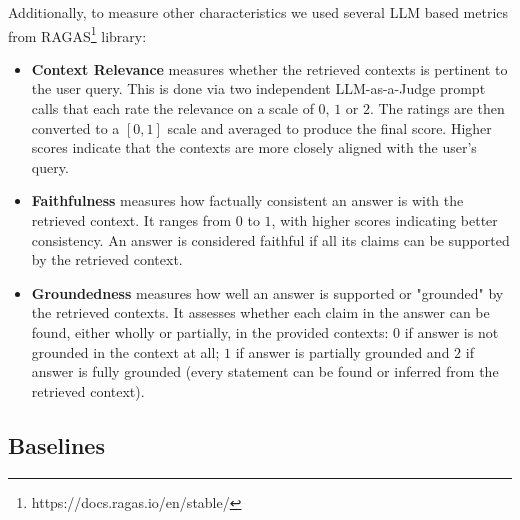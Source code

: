 Additionally, to measure other characteristics we used several LLM based metrics from RAGAS\footnote{https://docs.ragas.io/en/stable/} library: 
\begin{itemize}
    \item \textbf{Context Relevance} measures whether the retrieved contexts is pertinent to the user query. This is done via two independent LLM-as-a-Judge prompt calls that each rate the relevance on a scale of $0$, $1$ or $2$. The ratings are then converted to a $[0,1]$ scale and averaged to produce the final score. Higher scores indicate that the contexts are more closely aligned with the user's query.
    \item \textbf{Faithfulness} measures how factually consistent an answer is with the retrieved context. It ranges from $0$ to $1$, with higher scores indicating better consistency. An answer is considered faithful if all its claims can be supported by the retrieved context.
    \item \textbf{Groundedness} measures how well an answer is supported or "grounded" by the retrieved contexts. It assesses whether each claim in the answer can be found, either wholly or partially, in the provided contexts: $0$ if answer is not grounded in the context at all; $1$ if answer is partially grounded and $2$ if answer is fully grounded (every statement can be found or inferred from the retrieved context).
\end{itemize}

\subsection{Baselines}

